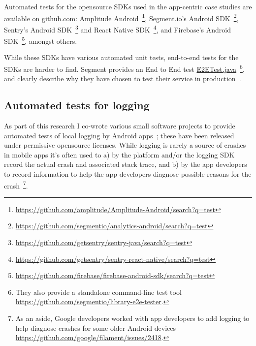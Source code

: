 Automated tests for the opensource SDKs used in the app-centric case studies are available on github.com: Amplitude Android~\footnote{\url{https://github.com/amplitude/Amplitude-Android/search?q=test}}, Segment.io's Android SDK~\footnote{ \url{https://github.com/segmentio/analytics-android/search?q=test}}, Sentry's Android SDK~\footnote{\url{https://github.com/getsentry/sentry-java/search?q=test}} and React Native SDK~\footnote{\url{https://github.com/getsentry/sentry-react-native/search?q=test}}, and Firebase's Android SDK~\footnote{\url{https://github.com/firebase/firebase-android-sdk/search?q=test}}, amongst others. 

While these SDKs have various automated unit tests, end-to-end tests for the SDKs are harder to find. Segment provides an End to End test  \href{https://github.com/segmentio/analytics-android/blob/master/analytics-samples/analytics-sample/src/androidTest/java/com/segment/analytics/E2ETest.java}{E2ETest.java}~\footnote{They also provide a standalone command-line test tool \url{https://github.com/segmentio/library-e2e-tester}.}, and clearly describe why they have chosen to test their service in production~\citep{segment2018_we_test_in_production_you_should_too}.  

\subsection{Automated tests for logging}
As part of this research I co-wrote various small software projects to provide automated tests of local logging by Android apps~\citep{android_crash_dummy, android_log_assert}; these have been released under permissive opensource licenses. While logging is rarely a source of crashes in mobile apps it's often used to a) by the platform and/or the logging SDK record the actual crash and associated stack trace, and b) by the app developers to record information to help the app developers diagnose possible reasons for the crash~\footnote{As an aside, Google developers worked with app developers to add logging to help diagnose crashes for some older Android devices \url{https://github.com/google/filament/issues/2418}.}. 

